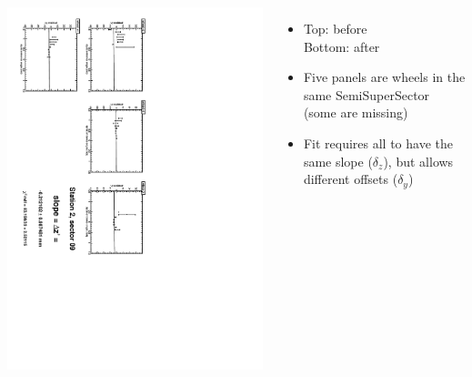 \documentclass[compress]{beamer}
\begin{document}
\begin{frame}
\begin{columns}
\vfill
\includegraphics[height=\linewidth, angle=90]{zfits_after/zfit_2_09.pdf}
\begin{itemize}
\item Top: before \\ Bottom: after
\item Five panels are wheels in the same SemiSuperSector (some are missing)
\item Fit requires all to have the same slope ($\delta_z$), but allows different offsets ($\delta_y$)
\end{itemize}
\end{columns}
\end{frame}
\end{document}
